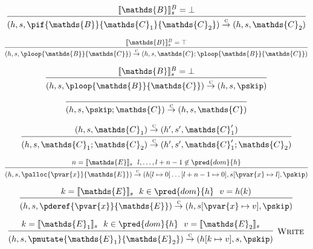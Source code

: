 \[
\infer
{
	(h, s, \pif{\mathds{B}}{\mathds{C}_1}{\mathds{C}_2})
	\overset{\textsc{c}}{\rightarrow}
	(h, s, \mathds{C}_2)
}
{
	\llbracket \mathds{B} \rrbracket_s^B = \bot
}
\]

\[
\infer
{
	(h, s, \ploop{\mathds{B}}{\mathds{C}})
	\overset{\textsc{c}}{\rightarrow}
	(h, s, \mathds{C}; \ploop{\mathds{B}}{\mathds{C}})
}
{
	\llbracket \mathds{B} \rrbracket_s^B = \top
}
\]

\[
\infer
{
	(h, s, \ploop{\mathds{B}}{\mathds{C}})
	\overset{\textsc{c}}{\rightarrow}
	(h, s, \pskip)
}
{
	\llbracket \mathds{B} \rrbracket_s^B = \bot
}
\]

\[
\infer
{
	(h, s, \pskip ; \mathds{C})
	\overset{\textsc{c}}{\rightarrow}
	(h, s, \mathds{C})
}
{}
\]

\[
\infer
{
	(h, s, \mathds{C}_1 ; \mathds{C}_2)
	\overset{\textsc{c}}{\rightarrow}
	(h', s', \mathds{C}_1' ; \mathds{C}_2)
}
{
	(h, s, \mathds{C}_1)
	\overset{\textsc{c}}{\rightarrow}
	(h', s',\mathds{C}_1')
}
\]

\[
\infer
{
	(h, s, \palloc{\pvar{x}}{\mathds{E}})
	\overset{\textsc{c}}{\rightarrow}
	(h[l \mapsto 0] \ldots [l + n - 1 \mapsto 0], s[\pvar{x} \mapsto l], \pskip)
}
{
	n = \llbracket \mathds{E} \rrbracket_s\ \
	l, \ldots, l + n - 1 \not\in \pred{dom}{h}
}
\]

\[
\infer
{
	(h, s, \pderef{\pvar{x}}{\mathds{E}})
	\overset{\textsc{c}}{\rightarrow}
	(h, s[\pvar{x} \mapsto v], \pskip)
}
{
	k = \llbracket \mathds{E} \rrbracket_s\ \
	k \in \pred{dom}{h}\ \
	v = h(k)
}
\]

\[
\infer[\textsc{Write}]
{
	(h, s, \pmutate{\mathds{E}_1}{\mathds{E}_2})
	\overset{\textsc{c}}{\rightarrow}
	(h[k \mapsto v], s, \pskip)
}
{
	k = \llbracket \mathds{E}_1 \rrbracket_s\ \
	k \in \pred{dom}{h}\ \
	v = \llbracket \mathds{E}_2 \rrbracket_s
}
\]
